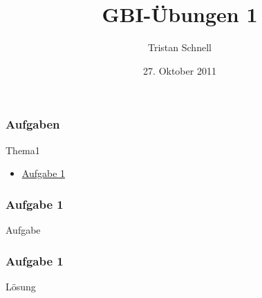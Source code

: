\documentclass{beamer}
\author{Tristan Schnell}
\title{GBI-Übungen 1}
\date{27. Oktober 2011}
\begin{document}
\begin{frame}[label=start]
	\frametitle{Aufgaben}
	\begin{block}{Thema1}
		\begin{itemize}
			\item \hyperlink{1.1}{Aufgabe 1}
		\end{itemize}
	\end{block}
\end{frame}

\begin{frame}[label=1.1]
	\frametitle{Aufgabe 1}
	\begin{block}{Aufgabe}

	\end{block}
\end{frame}

\begin{frame}
	\frametitle{Aufgabe 1}
	\begin{block}{Lösung}

	\end{block}
	\hyperlink{start}{}
\end{frame}
\end{document}

